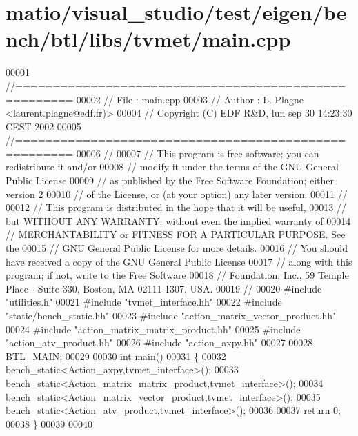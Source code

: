 \hypertarget{matio_2visual__studio_2test_2eigen_2bench_2btl_2libs_2tvmet_2main_8cpp_source}{}\section{matio/visual\+\_\+studio/test/eigen/bench/btl/libs/tvmet/main.cpp}
\label{matio_2visual__studio_2test_2eigen_2bench_2btl_2libs_2tvmet_2main_8cpp_source}

\begin{DoxyCode}
00001 \textcolor{comment}{//=====================================================}
00002 \textcolor{comment}{// File   :  main.cpp}
00003 \textcolor{comment}{// Author :  L. Plagne <laurent.plagne@edf.fr)>}
00004 \textcolor{comment}{// Copyright (C) EDF R&D,  lun sep 30 14:23:30 CEST 2002}
00005 \textcolor{comment}{//=====================================================}
00006 \textcolor{comment}{//}
00007 \textcolor{comment}{// This program is free software; you can redistribute it and/or}
00008 \textcolor{comment}{// modify it under the terms of the GNU General Public License}
00009 \textcolor{comment}{// as published by the Free Software Foundation; either version 2}
00010 \textcolor{comment}{// of the License, or (at your option) any later version.}
00011 \textcolor{comment}{//}
00012 \textcolor{comment}{// This program is distributed in the hope that it will be useful,}
00013 \textcolor{comment}{// but WITHOUT ANY WARRANTY; without even the implied warranty of}
00014 \textcolor{comment}{// MERCHANTABILITY or FITNESS FOR A PARTICULAR PURPOSE.  See the}
00015 \textcolor{comment}{// GNU General Public License for more details.}
00016 \textcolor{comment}{// You should have received a copy of the GNU General Public License}
00017 \textcolor{comment}{// along with this program; if not, write to the Free Software}
00018 \textcolor{comment}{// Foundation, Inc., 59 Temple Place - Suite 330, Boston, MA  02111-1307, USA.}
00019 \textcolor{comment}{//}
00020 \textcolor{preprocessor}{#include "utilities.h"}
00021 \textcolor{preprocessor}{#include "tvmet\_interface.hh"}
00022 \textcolor{preprocessor}{#include "static/bench\_static.hh"}
00023 \textcolor{preprocessor}{#include "action\_matrix\_vector\_product.hh"}
00024 \textcolor{preprocessor}{#include "action\_matrix\_matrix\_product.hh"}
00025 \textcolor{preprocessor}{#include "action\_atv\_product.hh"}
00026 \textcolor{preprocessor}{#include "action\_axpy.hh"}
00027 
00028 BTL\_MAIN;
00029 
00030 \textcolor{keywordtype}{int} main()
00031 \{
00032   bench\_static<Action\_axpy,tvmet\_interface>();
00033   bench\_static<Action\_matrix\_matrix\_product,tvmet\_interface>();
00034   bench\_static<Action\_matrix\_vector\_product,tvmet\_interface>();
00035   bench\_static<Action\_atv\_product,tvmet\_interface>();
00036 
00037   \textcolor{keywordflow}{return} 0;
00038 \}
00039 
00040 
\end{DoxyCode}
